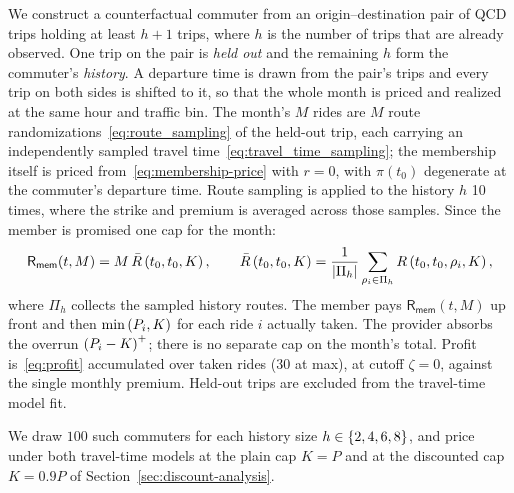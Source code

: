 \documentclass[12pt]{article}
\def\memebership{\textsf{R}_\textsf{mem}}
\begin{document}
{{{{{{{{We construct a counterfactual commuter from an origin--destination pair of QCD trips holding at
least $h+1$ trips, where $h$ is the number of trips that are already observed. One trip on the pair is \emph{held out} and the remaining $h$ form the commuter's
\emph{history}. A departure time is drawn from the pair's trips and every trip on both sides is
shifted to it, so that the whole month is priced and realized at the same hour and traffic bin.
The month's $M$ rides are $M$ route randomizations~\eqref{eq:route_sampling} of the held-out
trip, each carrying an independently sampled travel
time~\eqref{eq:travel_time_sampling}; the membership itself is priced
from~\eqref{eq:membership-price} with $r = 0$, with $\pi(t_0)$ degenerate at the commuter's
departure time. Route sampling is applied to the history $h$ 10 times, where the strike and premium is averaged across those samples. Since the member
is promised one cap for the month:
\begin{equation}\label{eq:commuter-premium}
    \memebership(t, M) = M\,\bar R\rbr{t_0,t_0,K}, \qquad
    \bar R\rbr{t_0,t_0,K} = \frac{1}{\abr{\Pi_h}}\sum_{\path_i \in \Pi_h} R\rbr{t_0,t_0,\path_i,K},
\end{equation}
where $\Pi_h$ collects the sampled history routes. The member pays $\memebership(t, M)$ up front
and then $\min\left(P_i, K\right)$ for each ride $i$ actually taken. The provider absorbs the overrun $\left(P_i - K\right)^{+}$; there is no separate cap on the month's
total. Profit is~\eqref{eq:profit} accumulated over taken rides (30 at max), at cutoff $\zeta = 0$, against the single monthly premium.
Held-out trips are excluded from the travel-time model fit.

We draw $100$ such commuters for each history size $h \in \left\{2,4,6,8\right\}$, and price under both travel-time models at the plain cap $K = P$ and at
the discounted cap $K = 0.9P$ of Section~\ref{sec:discount-analysis}.


}}}}}}}}
\end{document}
